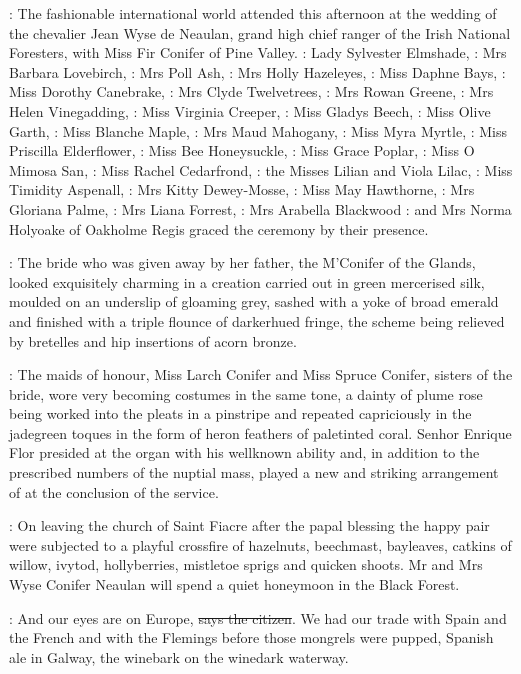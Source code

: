 :
The fashionable international world attended
 this afternoon
at the wedding of the chevalier Jean Wyse de Neaulan, grand high chief
ranger of the Irish National Foresters,
with Miss Fir Conifer of Pine Valley.
:
Lady Sylvester Elmshade,
:
Mrs Barbara Lovebirch, 
:
Mrs Poll Ash, 
:
Mrs Holly Hazeleyes, 
:
Miss Daphne Bays, 
:
Miss Dorothy Canebrake, 
:
Mrs Clyde Twelvetrees, 
:
Mrs Rowan Greene, 
:
Mrs Helen Vinegadding, 
:
Miss Virginia Creeper, 
:
Miss Gladys Beech, 
:
Miss Olive Garth, 
:
Miss Blanche Maple, 
:
Mrs Maud Mahogany, 
:
Miss Myra Myrtle, 
:
Miss Priscilla Elderflower, 
:
Miss Bee Honeysuckle, 
:
Miss Grace Poplar, 
:
Miss O Mimosa San, 
:
Miss Rachel Cedarfrond, 
:
the Misses Lilian and Viola Lilac, 
:
Miss Timidity Aspenall, 
:
Mrs Kitty Dewey-Mosse, 
:
Miss May Hawthorne, 
:
Mrs Gloriana Palme, 
:
Mrs Liana Forrest, 
:
Mrs Arabella Blackwood
:
and Mrs Norma Holyoake of Oakholme Regis
graced the ceremony by their presence.

:
The bride who was given away by her father, the M'Conifer of
the Glands, looked exquisitely charming in a creation carried out in green
mercerised silk, moulded on an underslip of gloaming grey, sashed with a
yoke of broad emerald and finished with a triple flounce of darkerhued
fringe, the scheme being relieved by bretelles and hip insertions of acorn bronze.

:
The maids of honour, Miss Larch Conifer and Miss Spruce Conifer,
sisters of the bride, wore very becoming costumes in the same tone, a
dainty  of plume rose
being worked into the pleats in a pinstripe and
repeated capriciously in the jadegreen toques in the form of heron
feathers of paletinted coral. Senhor Enrique Flor presided at the
organ with his wellknown ability and, in addition to the prescribed
numbers of the nuptial mass, played a new and striking arrangement
of  at the conclusion of the
service.

:
On leaving the church of Saint Fiacre  after the papal
blessing the happy pair were subjected to a playful crossfire
of hazelnuts, beechmast, bayleaves, catkins of willow, ivytod,
hollyberries, mistletoe sprigs and quicken shoots. Mr and Mrs Wyse
Conifer Neaulan will spend a quiet honeymoon in the Black Forest.

\citizen:
And our eyes are on Europe, \sout{says the citizen}.
We had our trade with
Spain and the French and with the Flemings before those mongrels were
pupped, Spanish ale in Galway, the winebark on the winedark waterway.


